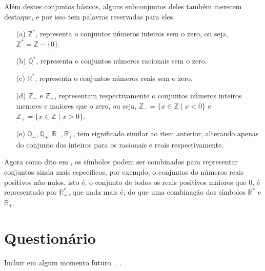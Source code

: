 Além destes conjuntos básicos, alguns subconjuntos deles também merecem destaque, e por isso tem palavras reservadas para eles.

\begin{itemize}
  \item[(a)] $\mathbb{Z}^*$, representa o conjuntos números inteiros sem o zero, ou seja, $\mathbb{Z}^* = \mathbb{Z} - \{0\}$.
  \item[(b)] $\mathbb{Q}^*$, representa o conjuntos números racionais sem o zero.
  \item[(c)] $\mathbb{R}^*$, representa o conjuntos números reais sem o zero.
  \item[(d)] $\mathbb{Z}_-$ e $\mathbb{Z}_+$, representam respectivamente o conjuntos números inteiros menores e maiores que o zero, ou seja, $\mathbb{Z}_- = \{x \in \mathbb{Z} \mid x < 0\}$ e $\mathbb{Z}_+ = \{x \in \mathbb{Z} \mid x > 0\}$.
  \item[(e)] $\mathbb{Q}_-, \mathbb{Q}_+, \mathbb{R}_-, \mathbb{R}_+$, tem significado similar ao item anterior, alterando apenas do conjunto dos inteiros para os racionais e reais respectivamente.
\end{itemize}

Agora como dito em \cite{carmo2013}, os símbolos podem ser combinados para representar conjuntos ainda mais especificos, por exemplo, o conjuntos do números reais positivos não nulos, isto é, o conjunto de todos os reais positivos maiores que $0$, é representado por $\mathbb{R}^*_+$, que nada mais é, do que uma combinação dos símbolos $\mathbb{R}^*$ e $\mathbb{R}_+$.

\section{Questionário}\label{sec:Questionario1part1}

{\color{red} Incluir em algum momento futuro. . .}